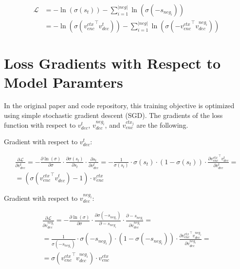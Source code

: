 \documentclass[11pt]{article}
\begin{document}
\begin{equation}
\begin{split}
    \mathcal{L} &= -\ln(\sigma(s_t)) - \sum_{i=1}^{|neg|}\ln(\sigma(-s_{neg_i})) \\
                &= -\ln(\sigma({v^{ctx}_{enc}}^\top v^t_{dec})) - \sum_{i=1}^{|neg|}\ln(\sigma(-{v^{ctx}_{enc}}^\top v^{neg_i}_{dec}))
\end{split}
\end{equation}

\section{Loss Gradients with Respect to Model Paramters}

In the original paper and code repository, this training objective is optimized using simple stochastic gradient descent (SGD). The gradients of the loss function with respect to $v_{dec}^t$, $v_{dec}^{neg_i}$, and $v_{enc}^{ctx_j}$ are the following.

Gradient with respect to $v_{dec}^t$:

\begin{equation}
\begin{gathered}
\frac{\partial \mathcal{L}}{\partial v_{dec}^t} 
    = - \frac{\partial \ln(\sigma)}{\partial \sigma} \cdot \frac{\partial \sigma(s_t)}{\partial s_t} \cdot \frac{\partial s_t}{\partial v_{dec}^t} = -\frac{1}{\sigma(s_t)} \cdot \sigma(s_t) \cdot (1 - \sigma(s_t)) \cdot \frac{\partial {v^{ctx}_{enc}}^\top v^t_{dec}}{\partial v_{dec}^t} = \\
    = (\sigma({v^{ctx}_{enc}}^\top v^t_{dec}) - 1) \cdot v^{ctx}_{enc}
\end{gathered}
\end{equation}

Gradient with respect to $v_{dec}^{neg_i}$:

\begin{equation}
\begin{gathered}
\frac{\partial \mathcal{L}}{\partial v_{dec}^{neg_i}} 
    = - \frac{\partial \ln(\sigma)}{\partial \sigma} \cdot \frac{\partial \sigma(-s_{neg_i})}{\partial -s_{neg_i}} \cdot \frac{\partial -s_{neg_i}}{\partial v_{dec}^{neg_i}} = \\
    = \frac{1}{\sigma(-s_{neg_i})} \cdot \sigma(-s_{neg_i}) \cdot (1 - \sigma(-s_{neg_i})) \cdot \frac{\partial {v^{ctx}_{enc}}^\top v^{neg_i}_{dec}}{\partial v_{dec}^{neg_i}} = \\
    = \sigma({v^{ctx}_{enc}}^\top v^{neg_i}_{dec}) \cdot v^{ctx}_{enc}
\end{gathered}
\end{equation}
\end{document}
